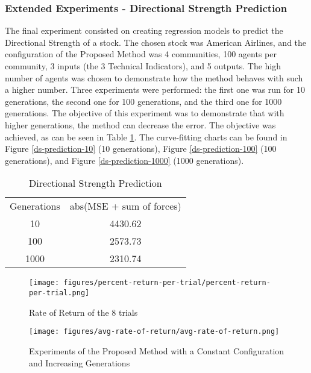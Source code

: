\documentclass[12pt,journal,draftcls,onecolumn]{IEEEtran}
\begin{document}
\subsubsection{Extended Experiments - Directional Strength Prediction}
  
The final experiment consisted on creating regression models to predict the Directional Strength of a stock. The chosen stock was American Airlines, and the configuration of the Proposed Method was 4 communities, 100 agents per community, 3 inputs (the 3 Technical Indicators), and 5 outputs. The high number of agents was chosen to demonstrate how the method behaves with such a higher number. Three experiments were performed: the first one was run for 10 generations, the second one for 100 generations, and the third one for 1000 generations. The objective of this experiment was to demonstrate that with higher generations, the method can decrease the error. The objective was achieved, as can be seen in Table \ref{ds-mse-table}. The curve-fitting charts can be found in Figure \ref{ds-prediction-10} (10 generations), Figure \ref{ds-prediction-100} (100 generations), and Figure \ref{ds-prediction-1000} (1000 generations).

\begin{table}
    \caption{Directional Strength Prediction}
    \label{ds-mse-table}
    \begin{tabular}{ c c }
        Generations & abs(MSE + sum of forces) \\ 
        10 & 4430.62 \\ 
        100 & 2573.73 \\ 
        1000 & 2310.74 \\ 
    \end{tabular} 
\end{table}


\begin{figure}[htp]
\caption{Rate of Return of the 8 trials}
\label{8-trials}
\begin{center}
\texttt{[image: figures/percent-return-per-trial/percent-return-per-trial.png]}
\end{center}
\end{figure}

\begin{figure}[htp]
\caption{Experiments of the Proposed Method with a Constant
  Configuration and Increasing Generations}
\label{constant-configuration-generations}
\begin{center}
\texttt{[image: figures/avg-rate-of-return/avg-rate-of-return.png]}
\end{center}
\end{figure}
\end{document}
